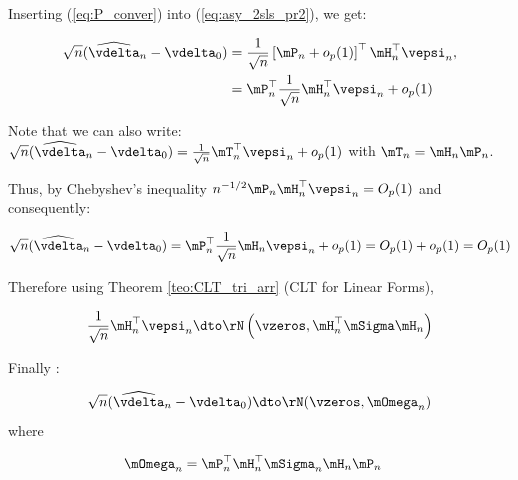 \documentclass[english,12pt]{book}\usepackage[]{graphicx}\usepackage[]{xcolor}
\begin{document}
Inserting (\ref{eq:P_conver}) into (\ref{eq:asy_2sls_pr2}), we get:

\begin{equation*}
\begin{aligned}
\sqrt{n}(\widehat{\vdelta}_{n} - \vdelta_0) & = \frac{1}{\sqrt{n}}\left[\mP_n + o_p(1)\right]^\top\mH^\top_n\vepsi_n, \\
                                            & =\mP^\top_n\frac{1}{\sqrt{n}}\mH^\top_n\vepsi_n + o_p(1)
\end{aligned}
\end{equation*}

Note that we can also write: $\sqrt{n}(\widehat{\vdelta}_{n} - \vdelta_0) = \frac{1}{\sqrt{n}}\mT_n^\top\vepsi_n + o_p(1)$ with $\mT_n = \mH_n\mP_n$. 



Thus, by Chebyshev's inequality  $n^{-1/2}\mP_n\mH^\top_n\vepsi_n = O_p(1)$ and  consequently:

\begin{equation*}
\sqrt{n}(\widehat{\vdelta}_{n} - \vdelta_0) = \mP^\top_n\frac{1}{\sqrt{n}}\mH_n\vepsi_n + o_p(1) = O_p(1) + o_p(1) = O_p(1)
\end{equation*}

Therefore using Theorem \ref{teo:CLT_tri_arr} (CLT for Linear Forms),

\begin{equation*}
\frac{1}{\sqrt{n}}\mH_n^\top\vepsi_n \dto \rN\left(\vzeros,\mH_n^\top \mSigma \mH_n\right)
\end{equation*}

Finally :


\begin{equation*}
\sqrt{n}(\widehat{\vdelta}_{n} - \vdelta_0) \dto \rN(\vzeros, \mOmega_n)
\end{equation*}
%
where

\begin{equation}
  \begin{aligned}
      \mOmega_n& = \mP^\top_n\mH^\top_n\mSigma_n\mH_n\mP_n
  \end{aligned}
\end{equation}


\end{document}
